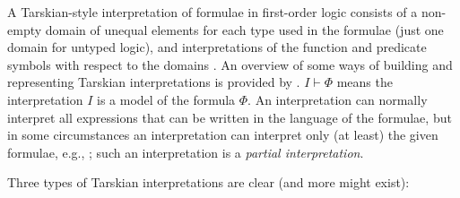 \documentclass{easychair}
\begin{document}
A Tarskian-style interpretation \cite{TV56} of formulae in first-order logic consists of a 
non-empty domain of unequal elements for each type used in the formulae (just one domain for 
untyped logic), and interpretations of the function and predicate symbols with respect to the 
domains \cite{Hun96,Gal15}.
An overview of some ways of building and representing Tarskian interpretations is provided 
by \cite{CLP04}.
$I \vdash \Phi$ means the interpretation $I$ is a model of the formula $\Phi$.
An interpretation can normally interpret all expressions that can be written in the language of 
the formulae, but in some circumstances an interpretation can interpret only (at least) the given 
formulae, e.g., \cite{BSW23}; such an interpretation is a {\em partial interpretation}.

Three types of Tarskian interpretations are clear (and more might exist):
\end{document}
